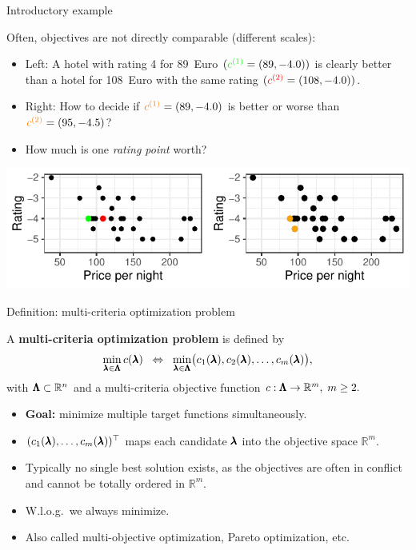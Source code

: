 \documentclass[11pt,compress,t,notes=noshow,xcolor=table]{beamer}
\begin{document}
\begin{vbframe}{Introductory example}
\framebreak

Often, objectives are not directly comparable (different scales):
\begin{itemize}
  \item Left: A hotel with rating 4 for 89~Euro 
        \((\textcolor{green}{c^{(1)}} = (89, -4.0))\) 
        is clearly better than a hotel for 108~Euro with the same rating
        \((\textcolor{red}{c^{(2)}} = (108, -4.0))\).
  \item Right: How to decide if 
        \(\textcolor{orange}{c^{(1)}}=(89, -4.0)\) is better or worse than 
        \(\textcolor{orange}{c^{(2)}}=(95, -4.5)\)?
  \item How much is one \emph{rating point} worth?
\end{itemize}

\begin{center}
\includegraphics[scale=1]{slides/11-multicrit/figure_man/expedia-2-1.pdf}
\end{center}

\end{vbframe}

\begin{vbframe}{Definition: multi-criteria optimization problem}

A \textbf{multi-criteria optimization problem} is defined by
\[
\min_{\pmb{\lambda} \in \pmb{\Lambda}}  c(\pmb{\lambda}) 
\;\;\Leftrightarrow\;\;
\min_{\pmb{\lambda} \in \pmb{\Lambda}} 
\bigl(c_1(\pmb{\lambda}), c_2(\pmb{\lambda}), \dots, c_m(\pmb{\lambda})\bigr),
\]
with \(\pmb{\Lambda} \subset \mathbb{R}^n\) and a multi-criteria objective function
\(c: \pmb{\Lambda} \to \mathbb{R}^m,\; m \ge 2.\)

\begin{itemize}
\item \textbf{Goal:} minimize multiple target functions simultaneously.
\item \((c_1(\pmb{\lambda}), \dots, c_m(\pmb{\lambda}))^\top\) maps each candidate 
      \(\pmb{\lambda}\) into the objective space \(\mathbb{R}^m\).
\item Typically no single best solution exists, as the objectives are often 
      in conflict and cannot be totally ordered in \(\mathbb{R}^m\).
\item W.l.o.g.\ we always minimize.
\item Also called multi-objective optimization, Pareto optimization, etc.
\end{itemize}

\end{vbframe}
\end{document}
